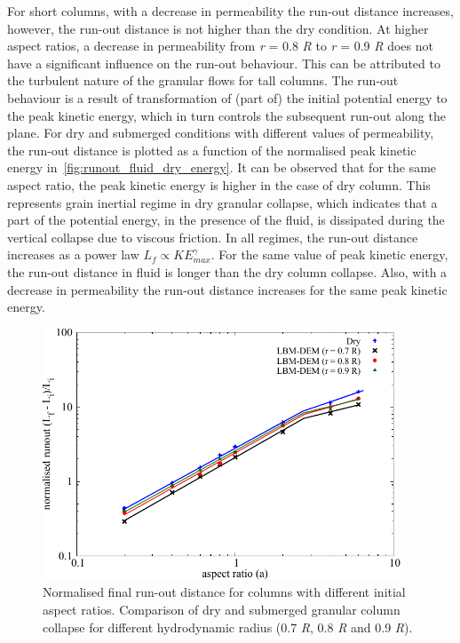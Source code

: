 For short columns, with a decrease in permeability the run-out distance 
increases, however, the run-out distance is not higher than the dry condition. 
At higher aspect ratios, a decrease in permeability from \textit{r} = 0.8 
\textit{R} to 
\textit{r} = 0.9 \textit{R} 
does not have a significant influence on the run-out behaviour. This can be 
attributed to the turbulent nature of the granular flows for tall 
columns. The run-out behaviour is a result of transformation of (part of) the 
initial potential energy to the peak kinetic energy, which in turn controls the 
subsequent run-out along the plane. For dry and submerged conditions with 
different values of permeability, the run-out distance is plotted as a 
function of the normalised peak kinetic energy 
in~\cref{fig:runout_fluid_dry_energy}. It can be observed that for the same 
aspect ratio, the peak kinetic energy is higher in the case of dry column. This 
represents grain inertial regime in dry granular collapse, which indicates that 
a part of the potential energy, in the presence of the fluid, is dissipated 
during the vertical collapse due to viscous friction. In all regimes, the 
run-out distance increases as a power law $L_f \propto KE_{max}^\gamma$. For 
the same value of peak kinetic energy, the run-out distance in fluid is longer 
than the dry column collapse. Also, with a decrease in 
permeability the run-out distance increases for the same peak kinetic energy. 
\begin{figure}[tbhp]
	\centering
	\includegraphics[width=0.95\textwidth]{runout_fluid_dry}
	\caption{Normalised final run-out distance for columns with different 
	initial aspect ratios. Comparison of dry and submerged granular column 
	collapse for different hydrodynamic radius (0.7 \textit{R}, 0.8 \textit{R} 
	and 0.9 \textit{R}).}
	\label{fig:runout_fluid_dry}
\end{figure} 

